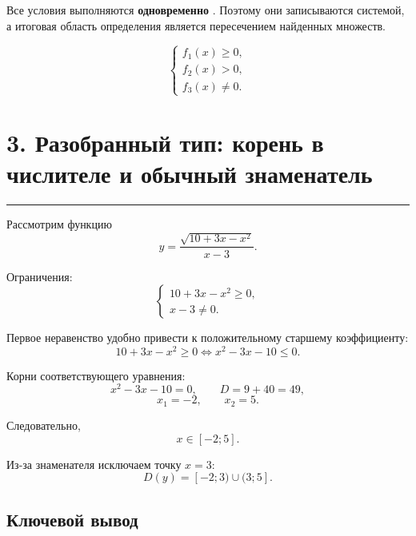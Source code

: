 \documentclass[a4paper,12pt]{article}
\newcommand{\topicsection}[1]{%
    \section*{\textcolor{darkaccent}{#1}}%
    \vspace{-0.4em}%
    \textcolor{accent}{\rule{\linewidth}{0.7pt}}%
    \vspace{0.4em}%
}
\newcommand{\key}[1]{%
    \textcolor{darkaccent}{\textbf{#1}}%
}
\begin{document}
Все условия выполняются \key{одновременно}. Поэтому они записываются системой, а итоговая область определения является пересечением найденных множеств.

\[
\begin{cases}
f_1(x)\ge 0,\\
f_2(x)>0,\\
f_3(x)\ne 0.
\end{cases}
\]

\topicsection{3. Разобранный тип: корень в числителе и обычный знаменатель}

Рассмотрим функцию
\[
y=\frac{\sqrt{10+3x-x^2}}{x-3}.
\]

Ограничения:
\[
\begin{cases}
10+3x-x^2\ge 0,\\
x-3\ne 0.
\end{cases}
\]

Первое неравенство удобно привести к положительному старшему коэффициенту:
\[
10+3x-x^2\ge 0
\iff
x^2-3x-10\le 0.
\]

Корни соответствующего уравнения:
\[
x^2-3x-10=0,
\qquad
D=9+40=49,
\]
\[
x_1=-2,
\qquad
x_2=5.
\]

Следовательно,
\[
x\in[-2;5].
\]

Из-за знаменателя исключаем точку \(x=3\):
\[
\boxed{D(y)=[-2;3)\cup(3;5]}.
\]

\begin{center}
\end{center}

\subsection*{Ключевой вывод}
\end{document}
